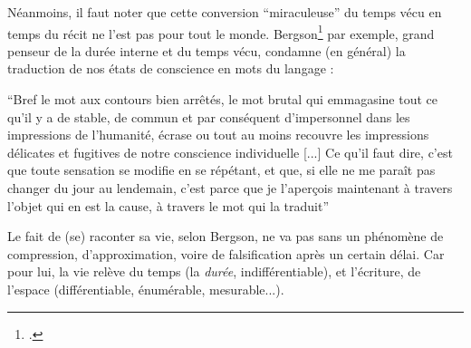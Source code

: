\documentclass[a4paper,10pt]{article}
\begin{document}
				Néanmoins, il faut noter que cette conversion ``miraculeuse'' du temps vécu en temps du récit ne l'est pas pour tout le monde. Bergson\footcite{Bergson1889} par exemple, grand penseur de la durée interne et du temps vécu, condamne (en général) la traduction de nos états de conscience en mots du langage :
				\begin{center}
					\footnotesize
					\begin{minipage}{0.7\textwidth}
						``Bref le mot aux contours bien arrêtés, le mot brutal qui emmagasine tout ce qu'il y a de stable, de commun et par conséquent d'impersonnel dans les impressions de l'humanité, écrase ou tout au moins recouvre les impressions délicates et fugitives de notre conscience individuelle [...] Ce qu'il faut dire, c'est que toute sensation se modifie en se répétant, et que, si elle ne me paraît pas changer du jour au lendemain, c'est parce que je l'aperçois maintenant à travers l'objet qui en est la cause, à travers le mot qui la traduit''
					\end{minipage}
				\end{center}
				Le fait de (se) raconter sa vie, selon Bergson, ne va pas sans un phénomène de compression, d'approximation, voire de falsification après un certain délai. Car pour lui, la vie relève du temps (la \textit{durée}, indifférentiable), et l'écriture, de l'espace (différentiable, énumérable, mesurable...).
\end{document}
